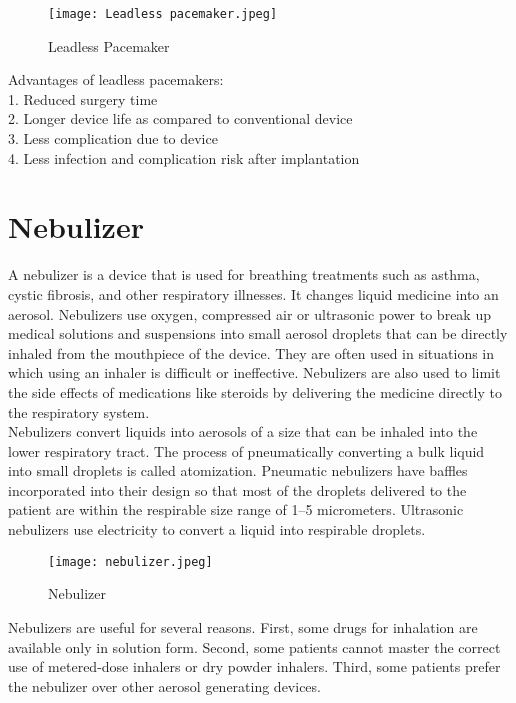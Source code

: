 \documentclass[12pt]{article}
\begin{document}
\begin{figure}[h]
\centering
\texttt{[image: Leadless pacemaker.jpeg]}
\caption{Leadless Pacemaker}
\end{figure}


Advantages of leadless pacemakers:\\
1. Reduced surgery time\\
2. Longer device life as compared to conventional device\\
3. Less complication due to device\\
4. Less infection and complication risk after implantation\\

\clearpage
\section{Nebulizer}

A nebulizer is a device that is used for breathing treatments such as asthma, cystic fibrosis, and other respiratory illnesses. It changes liquid medicine into an aerosol. Nebulizers use oxygen, compressed air or ultrasonic power to break up medical solutions and suspensions into small aerosol droplets that can be directly inhaled from the mouthpiece of the device. They are often used in situations in which using an inhaler is difficult or ineffective. Nebulizers are also used to limit the side effects of medications like steroids by delivering the medicine directly to the respiratory system.\\

Nebulizers convert liquids into aerosols of a size that can be inhaled into the lower respiratory tract. The process of pneumatically converting a bulk liquid into small droplets is called atomization. Pneumatic nebulizers have baffles incorporated into their design so that most of the droplets delivered to the patient are within the respirable size range of 1–5 micrometers. Ultrasonic nebulizers use electricity to convert a liquid into respirable droplets.\\

\begin{figure}[h] 
\centering 
\texttt{[image: nebulizer.jpeg]} 
\caption{Nebulizer} 
\end{figure}

Nebulizers are useful for several reasons. First, some drugs for inhalation are available only in solution form. Second, some patients cannot master the correct use of metered-dose inhalers or dry powder inhalers. Third, some patients prefer the nebulizer over other aerosol generating devices.\\
\end{document}
